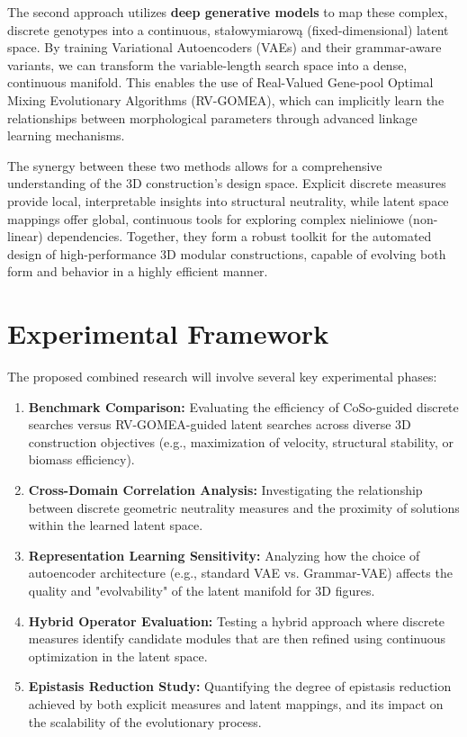 \documentclass[12pt,a4paper]{article}
\begin{document}
The second approach utilizes \textbf{deep generative models} to map these complex, discrete genotypes into a continuous, stałowymiarową (fixed-dimensional) latent space. By training Variational Autoencoders (VAEs) and their grammar-aware variants, we can transform the variable-length search space into a dense, continuous manifold. This enables the use of Real-Valued Gene-pool Optimal Mixing Evolutionary Algorithms (RV-GOMEA), which can implicitly learn the relationships between morphological parameters through advanced linkage learning mechanisms.

The synergy between these two methods allows for a comprehensive understanding of the 3D construction's design space. Explicit discrete measures provide local, interpretable insights into structural neutrality, while latent space mappings offer global, continuous tools for exploring complex nieliniowe (non-linear) dependencies. Together, they form a robust toolkit for the automated design of high-performance 3D modular constructions, capable of evolving both form and behavior in a highly efficient manner.

\section{Experimental Framework}
The proposed combined research will involve several key experimental phases:
\begin{enumerate}
    \item \textbf{Benchmark Comparison:} Evaluating the efficiency of CoSo-guided discrete searches versus RV-GOMEA-guided latent searches across diverse 3D construction objectives (e.g., maximization of velocity, structural stability, or biomass efficiency).
    \item \textbf{Cross-Domain Correlation Analysis:} Investigating the relationship between discrete geometric neutrality measures and the proximity of solutions within the learned latent space.
    \item \textbf{Representation Learning Sensitivity:} Analyzing how the choice of autoencoder architecture (e.g., standard VAE vs. Grammar-VAE) affects the quality and "evolvability" of the latent manifold for 3D figures.
    \item \textbf{Hybrid Operator Evaluation:} Testing a hybrid approach where discrete measures identify candidate modules that are then refined using continuous optimization in the latent space.
    \item \textbf{Epistasis Reduction Study:} Quantifying the degree of epistasis reduction achieved by both explicit measures and latent mappings, and its impact on the scalability of the evolutionary process.
\end{enumerate}
\end{document}
